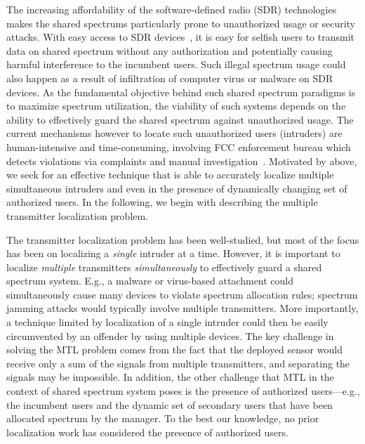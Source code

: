 The increasing affordability of the software-defined radio (SDR)
technologies makes the shared spectrums particularly prone to
unauthorized usage or security attacks. With easy access to SDR
devices~\cite{usrp,hackrf}, it is easy for selfish users to transmit data
on shared spectrum without any authorization and potentially causing
harmful interference to the incumbent users.  Such illegal spectrum
usage could also happen as a result of infiltration of computer virus
or malware on SDR devices.  As the fundamental objective behind such
shared spectrum paradigms is to maximize spectrum utilization, the
viability of such systems depends on the ability to effectively guard
the shared spectrum against unauthorized usage.  The current
mechanisms however to locate such unauthorized users (intruders) are
human-intensive and time-consuming, involving FCC enforcement bureau
which detects violations via complaints and manual
investigation~\cite{mobicom17-splot}. 
Motivated by above, we seek for an effective
technique that is able to accurately localize multiple simultaneous
intruders and even in the presence of dynamically changing set of
authorized users. In the following, we begin with describing the multiple transmitter localization problem.


  
 The transmitter localization problem has been well-studied, but most of the focus has been on localizing a {\em single} intruder at a time. However, it is important to localize {\em multiple} transmitters {\em simultaneously} to effectively guard a shared spectrum
system. E.g., a malware or virus-based attachment could simultaneously cause many devices to violate spectrum allocation rules; spectrum
jamming attacks would typically involve multiple transmitters. More
importantly, a technique limited by localization of a single intruder
could then be easily circumvented by an offender by using multiple
devices.
The key challenge in solving the MTL problem comes from the fact that
the deployed sensor would receive only a sum of the signals from multiple transmitters, and separating the signals may be impossible.  In
addition, the other challenge that MTL in the context of shared
spectrum system poses is the presence of authorized users---e.g., the
incumbent users and the dynamic set of secondary users that have been
allocated spectrum by the manager. To the best our knowledge, no prior
localization work has considered the presence of authorized users.


